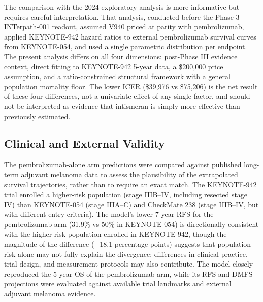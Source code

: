 \documentclass[12pt,a4paper]{article}
\begin{document}
The comparison with the 2024 exploratory analysis \cite{mclean2024} is more informative but requires careful interpretation. That analysis, conducted before the Phase 3 \mbox{INTerpath-001} readout, assumed V940 priced at parity with \mbox{pembrolizumab}, applied \mbox{KEYNOTE-942} hazard ratios to external \mbox{pembrolizumab} survival curves from KEYNOTE-054, and used a single parametric distribution per endpoint. The present analysis differs on all four dimensions: post-Phase III evidence context, direct fitting to \mbox{KEYNOTE-942} 5-year data, a \$200,000 price assumption, and a ratio-constrained structural framework with a general population mortality floor. The lower ICER (\$39,976 vs \$75,206) is the net result of these four differences, not a univariate effect of any single factor, and should not be interpreted as evidence that intismeran is simply more effective than previously estimated.

\subsection{Clinical and External Validity}

The \mbox{pembrolizumab}-alone arm predictions were compared against published long-term adjuvant melanoma data to assess the plausibility of the extrapolated survival trajectories, rather than to require an exact match. The \mbox{KEYNOTE-942} trial enrolled a higher-risk population (stage IIIB--IV, including resected stage IV) than KEYNOTE-054 (stage IIIA--C) and CheckMate 238 (stage IIIB--IV, but with different entry criteria). The model's lower 7-year RFS for the \mbox{pembrolizumab} arm (31.9\% vs 50\% in KEYNOTE-054) is directionally consistent with the higher-risk population enrolled in \mbox{KEYNOTE-942}, though the magnitude of the difference ($-$18.1 percentage points) suggests that population risk alone may not fully explain the divergence; differences in clinical practice, trial design, and measurement protocols may also contribute. The model closely reproduced the 5-year OS of the \mbox{pembrolizumab} arm, while its RFS and DMFS projections were evaluated against available trial landmarks and external adjuvant melanoma evidence.
\end{document}

